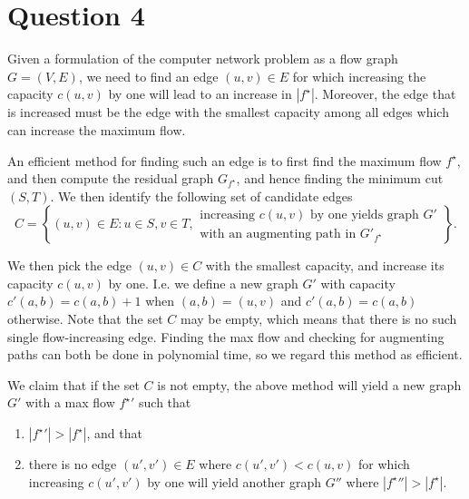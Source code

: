 \documentclass[a4paper, 10pt, oneside, article]{memoir}
\begin{document}
\section*{Question 4}

Given a formulation of the computer network problem as a flow graph
$G=(V,E)$, we need to find an edge $(u,v) \in E$ for which increasing
the capacity $c(u,v)$ by one will lead to an increase in
$|f^\star|$. Moreover, the edge that is increased must be the edge
with the smallest capacity among all edges which can increase the
maximum flow.

An efficient method for finding such an edge is to first find the
maximum flow $f^\star$, and then compute the residual graph
$G_{f^\star}$, and hence finding the minimum cut $(S,T)$. We then
identify the following set of candidate edges
$$
 C = \left\{ (u,v) \in E : u \in S, v \in T,
\substack{\text{increasing $c(u,v)$ by one yields graph $G'$}
       \\ \text{with an augmenting path in $G'_{f^\star}$}} \right\}.
$$

We then pick the edge $(u,v) \in C$ with the smallest capacity, and
increase its capacity $c(u,v)$ by one. I.e. we define a new graph $G'$
with capacity $c'(a,b) = c(a,b)+1$ when $(a,b) = (u,v)$ and $c'(a,b) =
c(a,b)$ otherwise. Note that the set $C$ may be empty, which means
that there is no such single flow-increasing edge. Finding the max
flow and checking for augmenting paths can both be done in polynomial
time, so we regard this method as efficient.

We claim that if the set $C$ is not empty, the above method will yield
a new graph $G'$ with a max flow ${f^\star}'$ such that
\begin{enumerate}
\item $|{f^\star}'| > |f^\star|$, and that
\item there is no edge $(u',v') \in E$ where $c(u',v') < c(u,v)$ for
  which increasing $c(u',v')$ by one will yield another graph $G''$
  where $|{f^\star}''| > |f^\star|$.
\end{enumerate}
\end{document}
